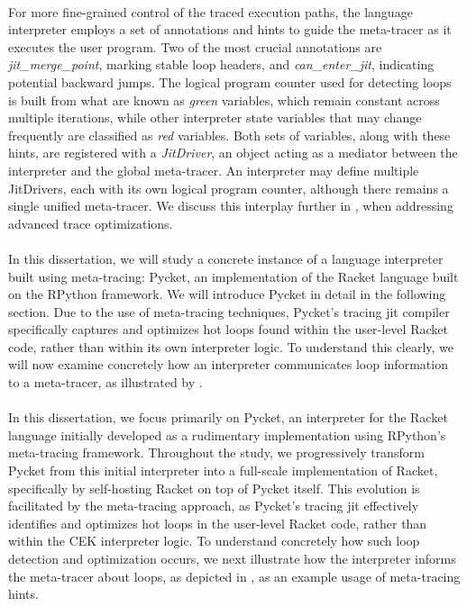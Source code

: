         \paragraph{}%
            For more fine-grained control of the traced execution paths, the language interpreter employs a set of annotations and hints to guide the meta-tracer as it executes the user program. Two of the most crucial annotations are \emph{jit\_merge\_point}, marking stable loop headers, and \emph{can\_enter\_jit}, indicating potential backward jumps. The logical program counter used for detecting loops is built from what are known as \emph{green} variables, which remain constant across multiple iterations, while other interpreter state variables that may change frequently are classified as \emph{red} variables. Both sets of variables, along with these hints, are registered with a \emph{JitDriver}, an object acting as a mediator between the interpreter and the global meta-tracer. An interpreter may define multiple JitDrivers, each with its own logical program counter, although there remains a single unified meta-tracer. We discuss this interplay further in , when addressing advanced trace optimizations.

        \paragraph{}%
            In this dissertation, we will study a concrete instance of a language interpreter built using meta-tracing: Pycket, an implementation of the Racket language built on the RPython framework. We will introduce Pycket in detail in the following section. Due to the use of meta-tracing techniques, Pycket’s tracing \gls{jit} compiler specifically captures and optimizes hot loops found within the user-level Racket code, rather than within its own interpreter logic. To understand this clearly, we will now examine concretely how an interpreter communicates loop information to a meta-tracer, as illustrated by .

        \paragraph{}%
            In this dissertation, we focus primarily on Pycket, an interpreter for the Racket language initially developed as a rudimentary implementation using RPython’s meta-tracing framework. Throughout the study, we progressively transform Pycket from this initial interpreter into a full-scale implementation of Racket, specifically by self-hosting Racket on top of Pycket itself. This evolution is facilitated by the meta-tracing approach, as Pycket's tracing \gls{jit} effectively identifies and optimizes hot loops in the user-level Racket code, rather than within the CEK interpreter logic. To understand concretely how such loop detection and optimization occurs, we next illustrate how the interpreter informs the meta-tracer about loops, as depicted in , as an example usage of meta-tracing hints.

